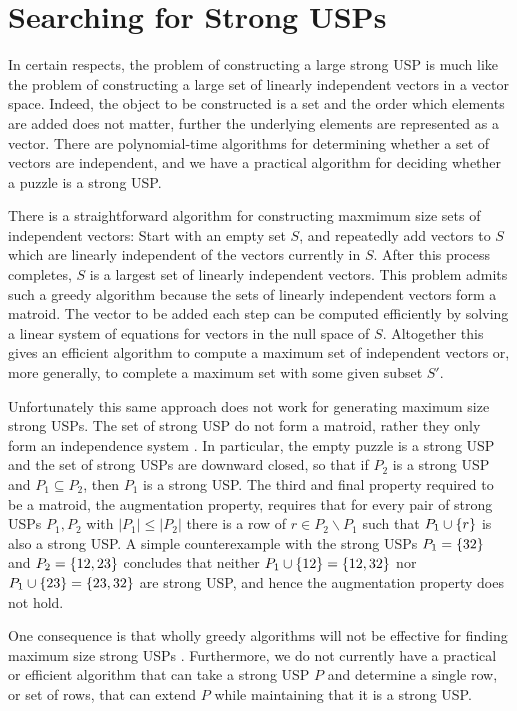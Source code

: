 \documentclass[11pt]{article}
\begin{document}
\section{Searching for Strong USPs}
\label{sec:search}

In certain respects, the problem of constructing a large strong USP is
much like the problem of constructing a large set of linearly
independent vectors in a vector space.  Indeed, the object to be
constructed is a set and the order which elements are added does not
matter, further the underlying elements are represented as a vector.
There are polynomial-time algorithms for determining whether a set of
vectors are independent, and we have a practical algorithm for
deciding whether a puzzle is a strong USP.

There is a straightforward algorithm for constructing maxmimum size
sets of independent vectors: Start with an empty set $S$, and
repeatedly add vectors to $S$ which are linearly independent of the
vectors currently in $S$.  After this process completes, $S$ is a
largest set of linearly independent vectors.  This problem admits such
a greedy algorithm because the sets of linearly independent vectors
form a matroid.  The vector to be added each step can be computed
efficiently by solving a linear system of equations for vectors in the
null space of $S$.  Altogether this gives an efficient algorithm to
compute a maximum set of independent vectors or, more generally, to
complete a maximum set with some given subset $S'$.

Unfortunately this same approach does not work for generating maximum
size strong USPs.  The set of strong USP do not form a matroid, rather
they only form an independence system \cite{XXX}.  In particular, the
empty puzzle is a strong USP and the set of strong USPs are downward
closed, so that if $P_2$ is a strong USP and $P_1 \subseteq P_2$, then
$P_1$ is a strong USP.  The third and final property required to be a
matroid, the augmentation property, requires that for every pair of
strong USPs $P_1, P_2$ with $|P_1| \le |P_2|$ there is a row of $r \in
P_2 \backslash P_1$ such that $P_1 \cup \left\{ r \right\}$ is also a strong USP.
A simple counterexample with the strong USPs $P_1 = \left\{ 32 \right\}$ and $P_2
= \left\{ 12, 23 \right\}$ concludes that neither $P_1 \cup \left\{ 12 \right\} = \left\{ 12,
  32 \right\}$ nor $P_1 \cup \left\{ 23 \right\} = \left\{ 23, 32 \right\}$ are strong USP, and
hence the augmentation property does not hold.

One consequence is that wholly greedy algorithms will not be effective
for finding maximum size strong USPs \cite{XXX}.  Furthermore, we do not
currently have a practical or efficient algorithm that can take a
strong USP $P$ and determine a single row, or set of rows, that can
extend $P$ while maintaining that it is a strong USP.
\end{document}
